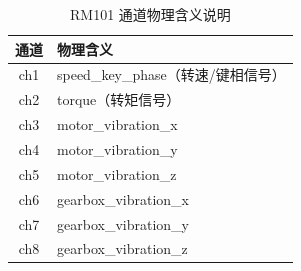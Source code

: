 \begin{table}[!htbp]
\centering
\caption{RM101 通道物理含义说明}
\label{tab:rm101_channel_alias}
\begin{tabular}{cl}
\toprule
\textbf{通道} & \textbf{物理含义} \\
\midrule
ch1 & speed\_key\_phase（转速/键相信号） \\
ch2 & torque（转矩信号） \\
ch3 & motor\_vibration\_x \\
ch4 & motor\_vibration\_y \\
ch5 & motor\_vibration\_z \\
ch6 & gearbox\_vibration\_x \\
ch7 & gearbox\_vibration\_y \\
ch8 & gearbox\_vibration\_z \\
\bottomrule
\end{tabular}
\end{table}
